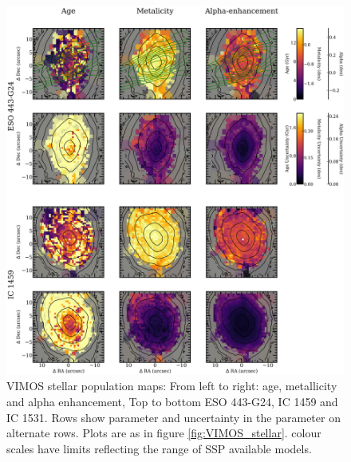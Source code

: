 		\begin{figure}
			\centering
			\includegraphics[height=0.94\textheight]{chapter4/vimos/pop1.png}
			\caption[VIMOS stellar population maps]{VIMOS stellar population maps: From left to right: age, metallicity and alpha enhancement, Top to bottom ESO 443-G24, IC 1459 and IC 1531. Rows show parameter and uncertainty in the parameter on alternate rows. Plots are as in figure \ref{fig:VIMOS_stellar}. colour scales have limits reflecting the range of SSP available models.}
			\label{fig:VIMOS_pop}
		\end{figure}
